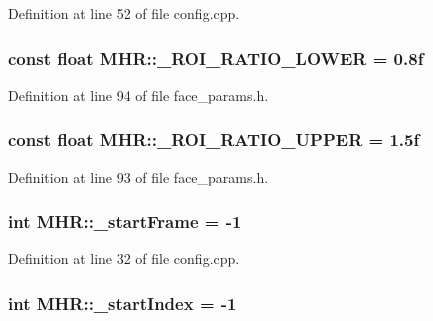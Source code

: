 Definition at line 52 of file config.\+cpp.

\hypertarget{namespace_m_h_r_a8a54577ca92c7aa81cc87355a7160063}{
\subsubsection[{\+\_\+\+R\+O\+I\+\_\+\+R\+A\+T\+I\+O\+\_\+\+L\+O\+W\+E\+R}]{\setlength{\rightskip}{0pt plus 5cm}const float M\+H\+R\+::\+\_\+\+R\+O\+I\+\_\+\+R\+A\+T\+I\+O\+\_\+\+L\+O\+W\+E\+R = 0.\+8f}}\label{namespace_m_h_r_a8a54577ca92c7aa81cc87355a7160063}


Definition at line 94 of file face\+\_\+params.\+h.

\hypertarget{namespace_m_h_r_a4059754ac07ffb5b08e096059f347a82}{
\subsubsection[{\+\_\+\+R\+O\+I\+\_\+\+R\+A\+T\+I\+O\+\_\+\+U\+P\+P\+E\+R}]{\setlength{\rightskip}{0pt plus 5cm}const float M\+H\+R\+::\+\_\+\+R\+O\+I\+\_\+\+R\+A\+T\+I\+O\+\_\+\+U\+P\+P\+E\+R = 1.\+5f}}\label{namespace_m_h_r_a4059754ac07ffb5b08e096059f347a82}


Definition at line 93 of file face\+\_\+params.\+h.

\hypertarget{namespace_m_h_r_ad8b548e54d84866330d426d8edc8877e}{
\subsubsection[{\+\_\+start\+Frame}]{\setlength{\rightskip}{0pt plus 5cm}int M\+H\+R\+::\+\_\+start\+Frame = -\/1}}\label{namespace_m_h_r_ad8b548e54d84866330d426d8edc8877e}


Definition at line 32 of file config.\+cpp.

\hypertarget{namespace_m_h_r_a7650c1d1c25787e60c4dbbdb5cedf3b8}{
\subsubsection[{\+\_\+start\+Index}]{\setlength{\rightskip}{0pt plus 5cm}int M\+H\+R\+::\+\_\+start\+Index = -\/1}}\label{namespace_m_h_r_a7650c1d1c25787e60c4dbbdb5cedf3b8}


